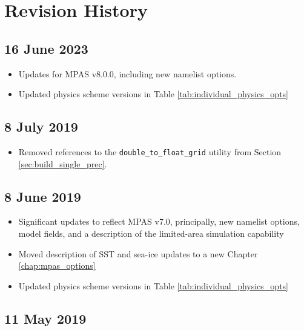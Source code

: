
\chapter{Revision History}

\section*{16 June 2023}

\begin{itemize}
\item Updates for MPAS v8.0.0, including new namelist options.
\item Updated physics scheme versions in Table \ref{tab:individual_physics_opts}
\end{itemize}

\section*{8 July 2019}

\begin{itemize}
\item Removed references to the {\tt double\_to\_float\_grid} utility from Section \ref{sec:build_single_prec}.
\end{itemize}

\section*{8 June 2019}

\begin{itemize}
\item Significant updates to reflect MPAS v7.0, principally, new namelist options, model fields, and a description of the
limited-area simulation capability
\item Moved description of SST and sea-ice updates to a new Chapter \ref{chap:mpas_options}
\item Updated physics scheme versions in Table \ref{tab:individual_physics_opts}
\end{itemize}

\section*{11 May 2019}

